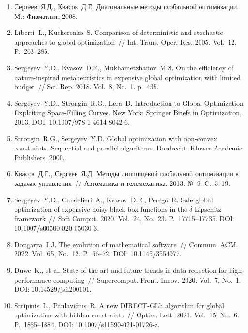\documentclass[a4paper,12pt,russian]{article}
\begin{document}
\begin{enumerate}
\item \label{rfa:rulit:Sergeyev2017}
Сергеев~Я.Д., Квасов~Д.Е. Диагональные методы глобальной оптимизации.  М.: Физматлит, 2008. 

\item \label{rfa:rulit:Liberti2005}
Liberti~L., Kucherenko~S. Comparison of deterministic and stochastic approaches to global optimization~// Int. Trans. Oper. Res. 2005. Vol.~12. P.~263--285.

\item \label{rfa:rulit:Sergeyev2018}
Sergeyev~Y.D., Kvasov~D.E., Mukhametzhanov~M.S. On the efficiency of nature-inspired metaheuristics in expensive global optimization with limited budget~// Sci. Rep. 2018. Vol.~8, No.~1. p.~435.

\item \label{rfa:rulit:Sergeyev2013}
Sergeyev~Y.D., Strongin~R.G., Lera~D. Introduction to Global Optimization Exploiting Space-Filling Curves. New York: Springer Briefs in Optimization, 2013. DOI: 10.1007/978-1-4614-8042-6.

\item \label{rfa:rulit:Strongin2000}
Strongin~R.G., Sergeyev~Y.D. Global optimization with non-convex constraints. Sequential and parallel algorithms. Dordrecht: Kluwer Academic Publishers, 2000.

\item \label{rfa:rulit:Kvasov2013}
Квасов~Д.Е., Сергеев~Я.Д. Методы липшицевой глобальной оптимизации в задачах управления~// Автоматика и телемеханика. 2013. №~9. C.~3--19.

\item \label{rfa:rulit:Sergeyev2020}
Sergeyev~Y.D., Candelieri~A., Kvasov~D.E., Perego~R. Safe global optimization of expensive noisy black-box functions in the $\delta$-Lipschitz framework~// Soft Comput. 2020. Vol.~24, No.~23. P.~17715--17735. DOI: 10.1007/s00500-020-05030-3.

\item \label{rfa:rulit:Dongarra2022}
Dongarra~J.J. The evolution of mathematical software~// Commun. ACM. 2022. Vol.~65, No.~12. P.~66--72. DOI: 10.1145/3554977.

\item \label{rfa:rulit:Duwe2020}
Duwe~K., et al. State of the art and future trends in data reduction for high-performance computing~// Supercomput. Front. Innov. 2020. Vol.~7, No.~1. DOI: 10.14529/jsfi200101.

\item \label{rfa:rulit:Stripinis2021}
Stripinis~L., Paulavi{\v c}ius~R. A new {DIRECT}-{GLh} algorithm for global optimization with hidden constraints~// Optim. Lett. 2021. Vol.~15, No.~6. P.~1865--1884.
DOI: 10.1007/s11590-021-01726-z.


\end{enumerate}
\end{document}
